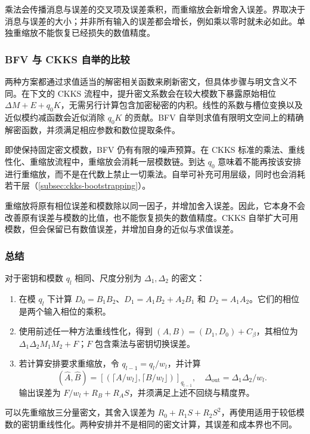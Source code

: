 乘法会传播消息与误差的交叉项及误差乘积，而重缩放会新增舍入误差。界取决于消息与误差的大小；并非所有输入的误差都会增长，例如乘以零时就未必如此。单独重缩放不能恢复已经损失的数值精度。

\subsubsection{BFV 与 CKKS 自举的比较}
\label{subsubsec:bfv-bootstrapping-ckks-comparison}

两种方案都通过求值适当的解密相关函数来刷新密文，但具体步骤与明文含义不同。在下文的 CKKS 流程中，提升密文系数会在较大模数下暴露原始相位 $\Delta M+E+q_0K$，无需另行计算包含加密秘密的内积。线性的系数与槽位变换以及近似模约减函数会近似消除 $q_0K$ 的贡献。BFV 自举则求值有限明文空间上的精确解密函数，并须满足相应参数和数位提取条件。

 即使保持固定密文模数，BFV 仍有有限的噪声预算。在 CKKS 标准的乘法、重线性化、重缩放流程中，重缩放会消耗一层模数链。到达 $q_0$ 意味着不能再按该安排进行重缩放，而不是在代数上禁止一切乘法。自举可补充可用层级，同时也会消耗若干层（\autoref{subsec:ckks-bootstrapping}）。

 重缩放将原有相位误差和模数除以同一因子，并增加舍入误差。因此，它本身不会改善原有误差与模数的比值，也不能恢复损失的数值精度。CKKS 自举扩大可用模数，但会保留已有数值误差，并增加自身的近似与求值误差。


\subsubsection{总结}
\label{subsubsec:ckks-mult-cipher-summary}

\begin{tcolorbox}[title={\textbf{\tboxlabel{\ref*{subsubsec:ckks-mult-cipher-summary}} CKKS 密文与密文乘法}}]
对于密钥和模数 $q_l$ 相同、尺度分别为 $\Delta_1,\Delta_2$ 的密文：
\begin{enumerate}
\item 在模 $q_l$ 下计算 $D_0=B_1B_2$、$D_1=A_1B_2+A_2B_1$ 和 $D_2=A_1A_2$。它们的相位是两个输入相位的乘积。
\item 使用前述任一种方法重线性化，得到 $(A,B)=(D_1,D_0)+C_\beta$，其相位为 $\Delta_1\Delta_2 M_1M_2+F$；$F$ 包含乘法与密钥切换误差。
\item 若计算安排要求重缩放，令 $q_{l-1}=q_l/w_l$，并计算
\[
(\widehat A,\widehat B)=[(\lceil A/w_l\rfloor,\lceil B/w_l\rfloor)]_{q_{l-1}},
\quad \Delta_{\mathrm{out}}=\Delta_1\Delta_2/w_l.
\]
输出误差为 $F/w_l+R_B+R_AS$，并须满足上述不回绕与精度界。
\end{enumerate}
 可以先重缩放三分量密文，其舍入误差为 $R_0+R_1S+R_2S^2$，再使用适用于较低模数的密钥重线性化。两种安排并不是相同的密文计算，其误差和成本界也不同。
\end{tcolorbox}


